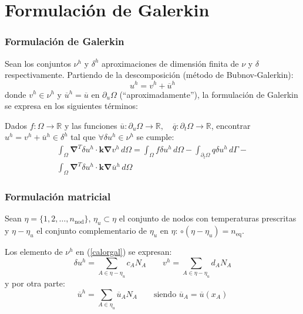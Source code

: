 \documentclass{beamer}
\begin{document}
\section{Formulación de Galerkin}
\begin{frame}
\frametitle{Formulación de Galerkin}
Sean los conjuntos $\nu^h$ y $\delta^h$ aproximaciones de
dimensión finita de $\nu$ y $\delta$ respectivamente. Partiendo de
la descomposición (método de Bubnov-Galerkin):
\begin{equation}
u^h=v^h+\overline{u}^h
\end{equation}
donde $v^h \in \nu^h$ y $\overline{u}^h=\overline{u}$ en $\partial_u \Omega$
(``aproximadamente''), la formulación de Galerkin se expresa en los
siguientes términos:

Dados $f:\Omega \rightarrow \mathbb{R}$ y las funciones
$\overline{u} :\partial_u \Omega \rightarrow \mathbb{R}, \quad
\overline{q} :\partial_t \Omega \rightarrow \mathbb{R}$, encontrar
$u^h=v^h+\overline{u}^h \in \delta^h$ tal que
$\forall \delta u^h \in \nu^h$ se cumple:
\begin{multline}
\int_{\Omega}
\bm{\nabla}^T \delta u^h \cdot \bm{k} \bm{\nabla} v^h \, d \Omega=
\int_{\Omega}
f \delta u^h \, d \Omega -
\int_{\partial_t \Omega} q \delta u^h \, d \Gamma- \\
\int_{\Omega}
\bm{\nabla}^T \delta u^h \cdot \bm{k} \bm{\nabla} \overline{u}^h \, d \Omega
\label{calorgal}
\end{multline}
\end{frame}
\begin{frame}
\frametitle{Formulación matricial}

Sean $\eta=\{ 1,2,\ldots,n_{\textrm{nod}} \}$,
$\eta_u \subset \eta$ el conjunto de nodos con temperaturas prescritas
y $\eta-\eta_u$ el conjunto complementario de $\eta_u$ en $\eta$:
$\circ(\eta-\eta_u)=n_{\textrm{eq}}$.

Los elemento de $\nu^h$ en (\ref{calorgal}) se expresan:
\begin{equation}
\delta u^h=\sum_{A \in \eta-\eta_u} c_A N_A \qquad
v^h=\sum_{A \in \eta-\eta_u} d_A N_A \label{termnuh}
\end{equation}
y por otra parte:
\begin{equation}
\overline{u}^h=\sum_{A \in \eta_u} \overline{u}_A N_A
\qquad \textrm{siendo } \overline{u}_A=\overline{u}(x_A) \label{termuh}
\end{equation}
\end{frame}
\end{document}
